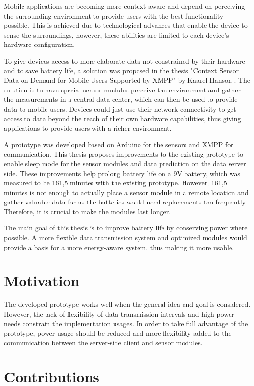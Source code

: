 Mobile applications are becoming more context aware and depend on perceiving the surrounding environment to provide users with the best functionality possible. This is achieved due to technological advances that enable the device to sense the surroundings, however, these abilities are limited to each device's hardware configuration. 

To give devices access to more elaborate data not constrained by their hardware and to save battery life, a solution was proposed in the thesis "Context Sensor Data on Demand for Mobile Users Supported by XMPP" by Kaarel Hanson \cite{prev_thesis}. The solution is to have special sensor modules perceive the environment and gather the measurements in a central data center, which can then be used to provide data to mobile users. Devices could just use their network connectivity to get access to data beyond the reach of their own hardware capabilities, thus giving applications to provide users with a richer environment.

A prototype was developed based on Arduino for the sensors and XMPP for communication. This thesis proposes improvements to the existing prototype to enable sleep mode for the sensor modules and data prediction on the data server side. These improvements help prolong battery life on a 9V battery, which was measured to be 161,5 minutes with the existing prototype. However, 161,5 minutes is not enough to actually place a sensor module in a remote location and gather valuable data for as the batteries would need replacements too frequently. Therefore, it is crucial to make the modules last longer.

The main goal of this thesis is to improve battery life by conserving power where possible. A more flexible data transmission system and optimized modules would provide a basis for a more energy-aware system, thus making it more usable.

\section{Motivation}
The developed prototype \cite{prev_thesis} works well when the general idea and goal is considered. However, the lack of flexibility of data transmission intervals and high power needs constrain the implementation usages. In order to take full advantage of the prototype, power usage should be reduced and more flexibility added to the communication between the server-side client and sensor modules.  

\section{Contributions}

